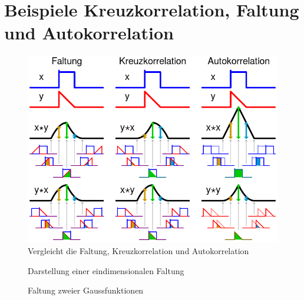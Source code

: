 \section{Beispiele Kreuzkorrelation, Faltung und Autokorrelation}
\begin{figure}[H]
  \centering
  \includegraphics[width=0.8\linewidth]{./images/comparisonConvolutionCorrelation.png}
  \caption[Vergleich zwischen Faltung, Kreuzkorrelation und Autokorrelation]{Vergleicht die Faltung, Kreuzkorrelation und Autokorrelation\footnotemark}
  \label{fig:compareConvulationCrosscorrelationAutoCorrelation}
\end{figure}

\begin{figure}[H]
  \centering
  \caption[Animation: Beispiel 1 für die Faltung]{Darstellung einer eindimensionalen Faltung\footnotemark}
  \label{fig:convolutionExample1}
\end{figure}

\begin{figure}[H]
  \centering
  \caption[Animation: Beispiel 2 für die Faltung]{Faltung zweier Gaussfunktionen\footnotemark}
  \label{fig:convolutionExample2}
\end{figure}

